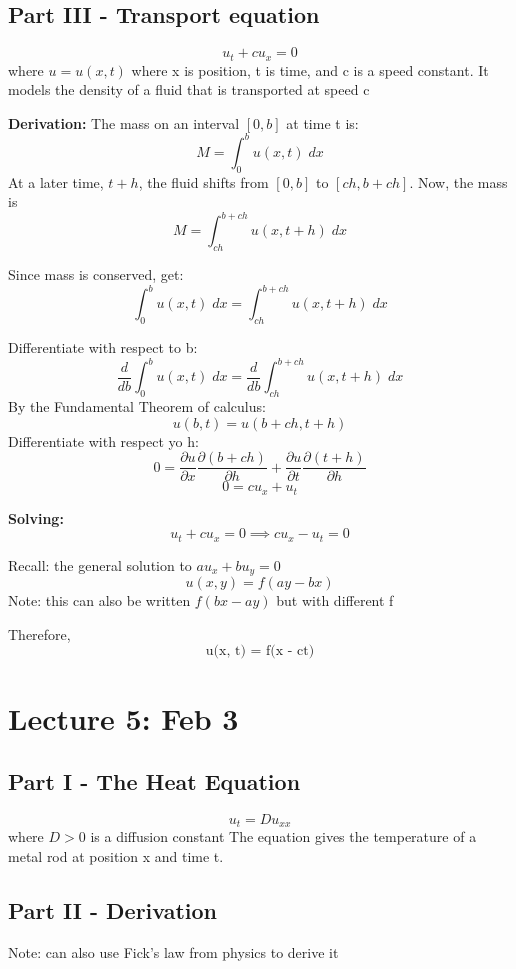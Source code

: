 \documentclass[12pt]{article}
\newcommand{\ans}[1]{\boxed{\text{#1}}}
\begin{document}
\subsection*{Part III - Transport equation}
\[u_t + cu_x = 0\]
where $u = u(x, t)$ where x is position, t is time, and c is a speed constant. 
It models the density of a fluid that is transported at speed c  

\textbf{Derivation:}
The mass on an interval $[0, b]$ at time t is:
\[M = \int_0^b u(x, t) \; dx\]
At a later time, $t + h$, the fluid shifts from $[0, b]$ to $[ch, b + ch]$. Now, the mass is 
\[M = \int_{ch}^{b+ch} u(x, t + h)\; dx\]

Since mass is conserved, get:
\[\int_0^b u(x, t) \; dx = \int_{ch}^{b+ch} u(x, t + h)\; dx\]

Differentiate with respect to b:
\[\frac{d}{db} \int_0^b u(x, t) \; dx = \frac{d}{db} \int_{ch}^{b+ch} u(x, t + h)\; dx\]
By the Fundamental Theorem of calculus:
\[u(b, t) = u(b+ch, t + h)\]
Differentiate with respect yo h:
\[0 = \frac{\partial u}{\partial x} \frac{\partial (b + ch)}{\partial h} + \frac{\partial u}{\partial t} \frac{\partial (t+h)}{\partial h}\]
\[0 = cu_x + u_t\]

\textbf{Solving:}
\[u_t + cu_x = 0 \implies cu_x - u_t = 0\]

Recall: the general solution to $au_x + bu_y = 0$
\[u(x, y) = f(ay - bx)\]
Note: this can also be written $f(bx - ay)$ but with different f 

Therefore, 
\[\ans{u(x, t) = f(x - ct)}\]

\section{Lecture 5: Feb 3}
\subsection*{Part I - The Heat Equation}
\[u_t = Du_{xx}\]
where $D > 0$ is a diffusion constant
The equation gives the temperature of a metal rod at position x and time t.

\subsection*{Part II - Derivation}
Note: can also use Fick's law from physics to derive it
\end{document}
